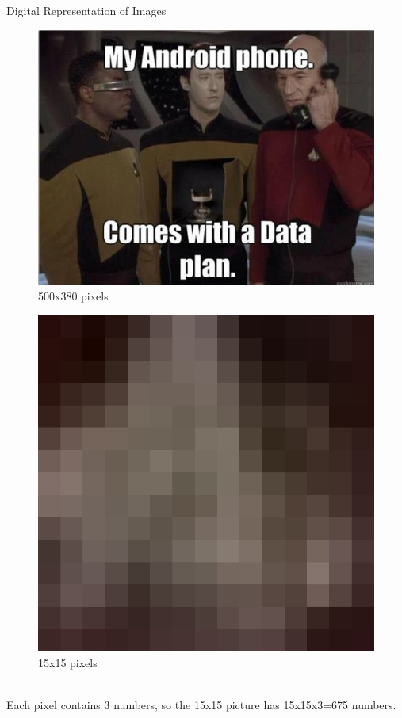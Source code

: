 \documentclass{beamer}
\begin{document}
\begin{frame}{Digital Representation of Images}
\begin{figure}[ht]
   \begin{minipage}[b]{0.45\linewidth}
      \centering
      \includegraphics[width=\textwidth]{figures/data.jpg}
      \\ 500x380 pixels
   \end{minipage}
   \hspace{0.5cm}
   \begin{minipage}[b]{0.45\linewidth}
      \centering
      \includegraphics[width=\textwidth]{figures/data_crop.pdf}
      \\ 15x15 pixels
   \end{minipage}
\end{figure}
~\\ Each pixel contains 3 numbers, so the 15x15 picture has 15x15x3=675 numbers.
\end{frame}
\end{document}
